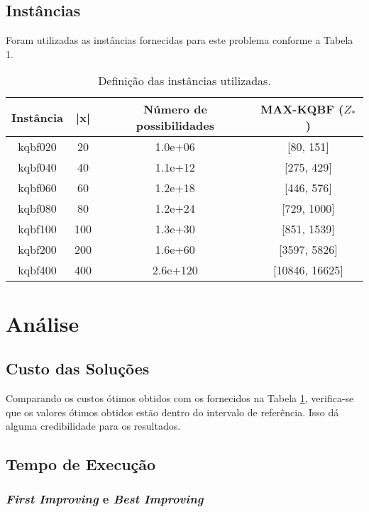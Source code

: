 \documentclass{article}
\theoremstyle{definition}
\newcommand{\firstImproving}{\textit{First Improving}\xspace}
\newcommand{\bestImproving}{\textit{Best Improving}\xspace}
\begin{document}
\subsection{Instâncias}
Foram utilizadas as instâncias fornecidas para este problema conforme a Tabela 1.
\begin{table}
    \centering
    \begin{tabular}{|c|c|c|c|}
        \hline
        Instância & |x| & Número de possibilidades & MAX-KQBF ($Z_*$) \\\hline
        kqbf020 &  20 &  1.0e+06 & [80, 151] \\\hline
        kqbf040 &  40 &  1.1e+12 & [275, 429] \\\hline
        kqbf060 &  60 &  1.2e+18 & [446, 576] \\\hline
        kqbf080 &  80 &  1.2e+24 & [729, 1000] \\\hline
        kqbf100 & 100 &  1.3e+30 & [851, 1539] \\\hline
        kqbf200 & 200 &  1.6e+60 & [3597, 5826] \\\hline
        kqbf400 & 400 & 2.6e+120 & [10846, 16625] \\\hline
    \end{tabular}
    \caption{Definição das instâncias utilizadas.}
    \label{table:tab-instances}
\end{table}

\section{Análise}

\subsection{Custo das Soluções}

Comparando os custos ótimos obtidos com os fornecidos na Tabela \ref{table:tab-instances}, verifica-se que os valores ótimos obtidos estão dentro do intervalo de referência. Isso dá alguma credibilidade para os resultados.

\subsection{Tempo de Execução}

\subsubsection{\firstImproving e \bestImproving}
\end{document}
